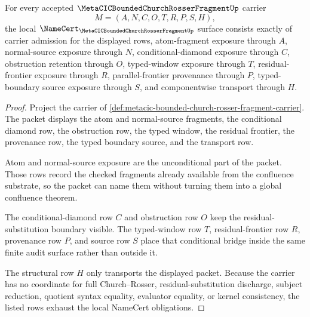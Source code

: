 \begin{theorem}
\label{thm:metacic-bounded-church-rosser-fragment-namecert-obligations}
For every accepted $\MetaCICBoundedChurchRosserFragmentUp$ carrier
$$
M=(A,N,C,O,T,R,P,S,H),
$$
the local $\NameCert_{\MetaCICBoundedChurchRosserFragmentUp}$ surface consists exactly of carrier admission for the displayed rows, atom-fragment exposure through $A$, normal-source exposure through $N$, conditional-diamond exposure through $C$, obstruction retention through $O$, typed-window exposure through $T$, residual-frontier exposure through $R$, parallel-frontier provenance through $P$, typed-boundary source exposure through $S$, and componentwise transport through $H$.
\end{theorem}
\begin{proof}
Project the carrier of \autoref{def:metacic-bounded-church-rosser-fragment-carrier}. The packet displays the atom and normal-source fragments, the conditional diamond row, the obstruction row, the typed window, the residual frontier, the provenance row, the typed boundary source, and the transport row.

Atom and normal-source exposure are the unconditional part of the packet. Those rows record the checked fragments already available from the confluence substrate, so the packet can name them without turning them into a global confluence theorem.

The conditional-diamond row $C$ and obstruction row $O$ keep the residual-substitution boundary visible. The typed-window row $T$, residual-frontier row $R$, provenance row $P$, and source row $S$ place that conditional bridge inside the same finite audit surface rather than outside it.

The structural row $H$ only transports the displayed packet. Because the carrier has no coordinate for full Church--Rosser, residual-substitution discharge, subject reduction, quotient syntax equality, evaluator equality, or kernel consistency, the listed rows exhaust the local NameCert obligations.
\end{proof}

